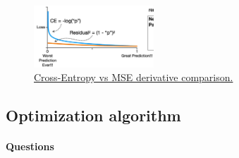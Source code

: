 \documentclass[12pt,a4paper]{article}
\begin{document}
\begin{enumerate}[resume]
    \begin{figure}[h]
        \centering
        \includegraphics[width=0.4\textwidth]{CEillustration.png}
        \caption{\protect\href{https://www.reddit.com/r/learnmachinelearning/comments/yyfhm4/understanding_statquest_video_why_cross_entropy/}{Cross-Entropy vs MSE derivative comparison.}}
        \label{fig:ce_vs_mse}
    \end{figure}

\end{enumerate}

\subsection{Optimization algorithm}

\paragraph{Questions}
\end{document}
